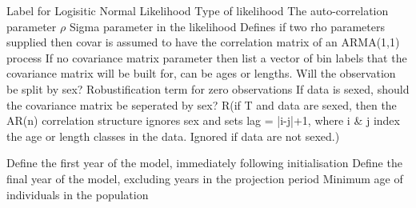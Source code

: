 \par\textbf{}\par
\par\textbf{}\par
\par\textbf{}\par
\par\textbf{}\par
\par\textbf{}\par
\par\textbf{}\par
{} {Label for Logisitic Normal Likelihood}
 {Type of likelihood}
 {The auto-correlation parameter $\rho$}
 {Sigma parameter in the likelihood}
 {Defines if two rho parameters supplied then covar is assumed to have the correlation matrix of an ARMA(1,1) process}
 {If no covariance matrix parameter then list a vector of bin labels that the covariance matrix will be built for, can be ages or lengths.}
 {Will the observation be split by sex?}
 {Robustification term for zero observations}
 {If data is sexed, should the covariance matrix be seperated by sex?}
 {R(if T and data are sexed, then the AR(n) correlation structure ignores sex and sets lag = |i-j|+1, where i \& j index the age or length classes in the data.  Ignored if data are not sexed.)}
\par\textbf{}\par
\par\textbf{}\par
\par\textbf{}\par
{}\par\par
{} {Define the first year of the model, immediately following initialisation}
 {Define the final year of the model, excluding years in the projection period}
 {Minimum age of individuals in the population}
